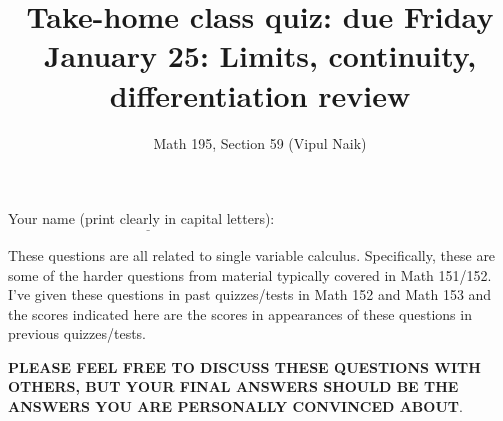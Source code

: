 \documentclass[10pt]{amsart}
\title{Take-home class quiz: due Friday January 25: Limits, continuity, differentiation review}
\author{Math 195, Section 59 (Vipul Naik)}
\begin{document}
\maketitle

Your name (print clearly in capital letters): $\underline{\qquad\qquad\qquad\qquad\qquad\qquad\qquad\qquad\qquad\qquad}$

These questions are all related to single variable
calculus. Specifically, these are some of the harder questions from
material typically covered in Math 151/152. I've given these questions
in past quizzes/tests in Math 152 and Math 153 and the scores
indicated here are the scores in appearances of these questions in
previous quizzes/tests.

{\bf PLEASE FEEL FREE TO DISCUSS THESE QUESTIONS WITH OTHERS, BUT YOUR
FINAL ANSWERS SHOULD BE THE ANSWERS YOU ARE PERSONALLY CONVINCED
ABOUT}.
\end{document}
